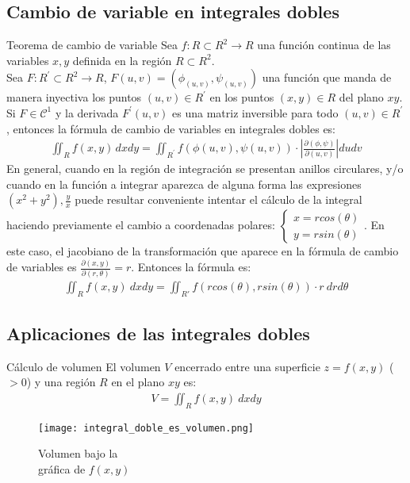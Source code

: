 \documentclass[a4paper, twoside]{article}
\numberwithin{equation}{section}
\numberwithin{figure}{section}
\numberwithin{table}{section}
\begin{document}
\subsection{Cambio de variable en integrales dobles}
\begin{teorema*}{Teorema de cambio de variable}
	Sea $f: R \subset R^2 \to R$ una función continua de las variables $x,y$ definida en la región $R \subset R^2$.\\
	Sea $F:R^\prime \subset R^2 \to R$, $F(u,v)=(\phi_{(u,v)},\psi_{(u,v)})$ una función que manda de manera inyectiva los puntos $(u,v)\in R^\prime$ en los puntos $(x,y)\in R$ del plano $xy$. Si $F \in \mathcal{C}^1$ y la derivada $F^\prime(u,v)$ es una matriz inversible para todo $(u,v) \in R^\prime$, entonces la fórmula de cambio de variables en integrales dobles es:
	\begin{align}
		\iint_{R}f(x,y)\, dxdy=\iint_{R^\prime}f\left(\phi(u,v),\psi(u,v)\right) \cdot \left|\frac{\partial(\phi,\psi)}{\partial(u,v)}\right|dudv
	\end{align}
	En general, cuando en la región de integración se presentan anillos circulares, y/o cuando en la función a integrar aparezca de alguna forma las expresiones $\left(x^2+y^2\right),\frac{y}{x}$ puede resultar conveniente intentar el cálculo de la integral haciendo previamente el cambio a coordenadas polares:
	$\begin{cases}
		x=rcos(\theta)\\
		y=rsin(\theta)
	\end{cases}$.
	En este caso, el jacobiano de la transformación que aparece en la fórmula de cambio de variables es $\frac{\partial (x,y)}{\partial (r,\theta)}=r$.
	Entonces la fórmula es:
	\begin{align}
		\iint_{R}f(x,y)\: dxdy=\iint_{R'}f\left(rcos(\theta),rsin(\theta)\right)\cdot r\: drd\theta
	\end{align}
\end{teorema*}

\subsection{Aplicaciones de las integrales dobles}
\begin{minipage}{0.6\textwidth}
	\begin{corolario*}{Cálculo de volumen}
		El volumen $V$ encerrado entre una superficie $z=f(x,y)$ ($>0$) y una región $R$ en el plano $xy$ es:
		\begin{align}
			V=\iint_{R}f\left(x,y\right)\: dxdy
		\end{align}
	\end{corolario*}
\end{minipage}
\begin{minipage}{0.3\textwidth}
	\begin{figure}[H]
		\centering
		\texttt{[image: integral\_doble\_es\_volumen.png]}
		\caption{Volumen bajo la\\ gráfica de $f(x,y)$}
	\end{figure}
\end{minipage}
\end{document}
